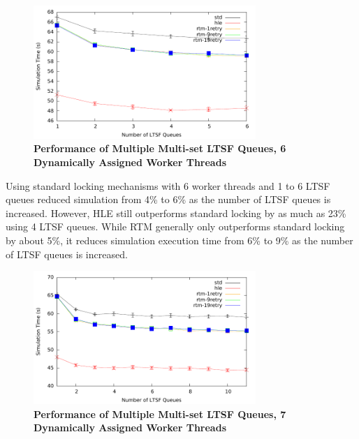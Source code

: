 \documentclass[11pt]{book}
\begin{document}
\begin{figure}
    \centering
    \graphicspath{ {./figures/} }
    \includegraphics[width=0.75\textwidth,keepaspectratio]{hugeepidemicsim-CONTmig-timeVSschedQs-multiset-6thread}
    \caption{\textbf{Performance of Multiple Multi-set LTSF Queues, 6 Dynamically Assigned Worker Threads}}
    \label{fig:contThrMig_timeVSschq_6threads}
\end{figure}

Using standard locking mechanisms with 6 worker threads and 1 to 6 LTSF queues
reduced simulation from 4\% to 6\% as the number of LTSF queues is increased.
However, HLE still outperforms standard locking by as much as 23\% using 4 LTSF
queues.  While RTM generally only outperforms standard locking by about 5\%, it
reduces simulation execution time from 6\% to 9\% as the number of LTSF queues
is increased.

\begin{figure}
    \centering
    \graphicspath{ {./figures/} }
    \includegraphics[width=0.75\textwidth,keepaspectratio]{hugeepidemicsim-CONTmig-timeVSschedQs-multiset-7thread}
    \caption{\textbf{Performance of Multiple Multi-set LTSF Queues, 7 Dynamically Assigned Worker Threads}}
    \label{fig:contThrMig_timeVSschq_7threads}
\end{figure}
\end{document}
